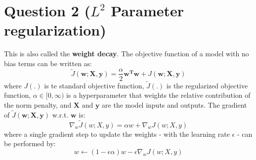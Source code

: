 \documentclass[fleqn]{article}
\begin{document}
\section*{Question 2 ($L^2$ Parameter regularization)}
This is also called the \textbf{weight decay}. The objective function of a model with no bias terms can be written as:
	\begin{equation*}
		\tilde{J}(\mathbf{w; X, y}) = \frac{\alpha}{2}\mathbf{w^Tw} + J(\mathbf{w; X, y})
	\end{equation*}
where $J(.)$ is te standard objective function, $\tilde{J}(.)$ is the regularized objective function, $\alpha \in [0, \infty)$ is a hyperparameter that weights the relative contribution of the norm penalty, and $\mathbf{X} \text{ and } \mathbf{y}$ are the model inputs and outputs. The gradient of $\tilde{J}(\mathbf{w; X, y})$ w.r.t. $\textbf{w}$ is:
	\begin{equation*}
		\nabla_w \tilde{J}(w; X, y) = \alpha w + \nabla_w J(w; X, y)
	\end{equation*}
where a single gradient step to update the weights - with the learning rate $\epsilon$ - can be performed by:
	\begin{equation*}
		w \leftarrow (1-\epsilon \alpha) w - \epsilon \nabla_w J(w; X, y)
	\end{equation*}
\end{document}
